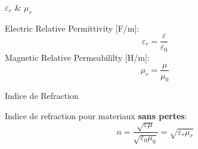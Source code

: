 \begin{frame}{$\varepsilon_r$ \& $\mu_r$}
    \begin{twocolumns}[0.5]
        \leftcol
            Electric Relative Permittivity [F/m]:
            \begin{equation}
                \varepsilon_r =\frac{\varepsilon}{\varepsilon_0}
            \end{equation}
            Magnetic Relative Permeabililty [H/m]:
            \begin{equation}
                \mu_r =\frac{\mu}{\mu_0}
            \end{equation}
        \rightcol
    \end{twocolumns}
\end{frame}

\begin{frame}{Indice de Refraction}
    \begin{twocolumns}[0.5]
        \leftcol
            Indice de refraction pour materiaux \textbf{sans pertes}:
            \begin{equation}
                n =\frac{\sqrt{\varepsilon \mu}}{\sqrt{\varepsilon_0 \mu_0}} = \sqrt{\varepsilon_r \mu_r}
            \end{equation}
        \rightcol
    \end{twocolumns}
\end{frame}


\begin{comment}
\subsection[4min - Max]{Charge Movement}
\begin{frame}{Plan}
    \begin{makelist}[\small][1.5]
        \icon[red]{\faTimes} & Comment les Electrons bougent\\
        \icon[red]{\faTimes} & Propriété materiaux
    \end{makelist}
\end{frame}

\begin{frame}{EM Properties of metals}
    \maketable{conductivity}
\end{frame}


\subsection[3min - Max]{Passive Components \rom{1}}
\begin{frame}{Plan}
    \begin{makelist}[\small][1.5]
        \icon[red]{\faTimes} & Resistance\\
        \icon[red]{\faTimes} & Condensateur \\
        \icon[red]{\faTimes} & Inducteur
    \end{makelist}
\end{frame}
\end{comment}